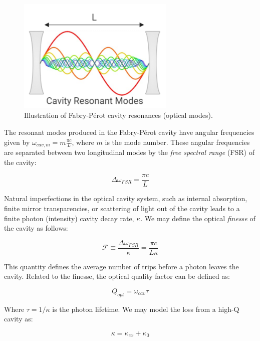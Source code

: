 \documentclass[%
 reprint,
nofootinbib,
 amsmath,amssymb,
 aps,
]{revtex4-2}
\begin{document}
\begin{figure}[htb]
    \centering
    \includegraphics [width=\columnwidth, height=5.5cm]{Fabry-Perot_Interferometer.PNG}
    \caption{Illustration of Fabry-P\'{e}rot  cavity resonances (optical modes).}
    \label{fig:Fabry-Perot Cavity}
\end{figure}


The resonant modes produced in the Fabry-P\'{e}rot cavity have angular frequencies given by $\omega_{cav,m} = m \frac{\pi c}{L}$, where $m$ is the mode number. These angular frequencies are separated between two longitudinal modes by the \textit{free spectral range} (FSR) of the cavity:

\begin{equation*}
   \Delta \omega_{FSR} = \frac{\pi c}{L}
\end{equation*}

Natural imperfections in the optical cavity system, such as internal absorption, finite mirror transparencies, or scattering of light out of the cavity leads to a finite photon (intensity) cavity decay rate, $\kappa$. We may define the optical \textit{finesse} of the cavity as follows:

\begin{equation*}
    \mathcal{F} \equiv \frac{\Delta \omega_{FSR}}{\kappa}= \frac{\pi c}{L \kappa}
\end{equation*}

This quantity defines the average number of trips before a photon leaves the cavity. Related to the finesse, the optical quality factor can be defined as:

\begin{equation*}
    Q_{opt} = \omega_{cav}\tau
\end{equation*}

Where $\tau = 1/\kappa$ is the photon lifetime. We may model the loss from a high-Q cavity as:

\begin{equation*}
    \kappa = \kappa_{ex} + \kappa_{0}
\end{equation*}
\end{document}
